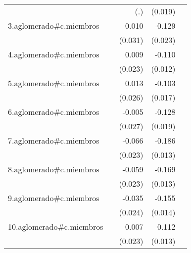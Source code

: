 {\begin{longtable}{l*{4}{D{.}{.}{-1}}}
            &                     &         (.)         &     (0.019)         &                     \\
\addlinespace
3.aglomerado#c.miembros&                     &       0.010         &      -0.129\sym{***}&                     \\
            &                     &     (0.031)         &     (0.023)         &                     \\
\addlinespace
4.aglomerado#c.miembros&                     &       0.009         &      -0.110\sym{***}&                     \\
            &                     &     (0.023)         &     (0.012)         &                     \\
\addlinespace
5.aglomerado#c.miembros&                     &       0.013         &      -0.103\sym{***}&                     \\
            &                     &     (0.026)         &     (0.017)         &                     \\
\addlinespace
6.aglomerado#c.miembros&                     &      -0.005         &      -0.128\sym{***}&                     \\
            &                     &     (0.027)         &     (0.019)         &                     \\
\addlinespace
7.aglomerado#c.miembros&                     &      -0.066\sym{**} &      -0.186\sym{***}&                     \\
            &                     &     (0.023)         &     (0.013)         &                     \\
\addlinespace
8.aglomerado#c.miembros&                     &      -0.059\sym{*}  &      -0.169\sym{***}&                     \\
            &                     &     (0.023)         &     (0.013)         &                     \\
\addlinespace
9.aglomerado#c.miembros&                     &      -0.035         &      -0.155\sym{***}&                     \\
            &                     &     (0.024)         &     (0.014)         &                     \\
\addlinespace
10.aglomerado#c.miembros&                     &       0.007         &      -0.112\sym{***}&                     \\
            &                     &     (0.023)         &     (0.013)         &                     \\

\end{longtable}}
